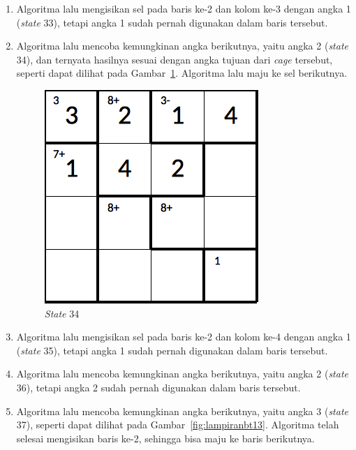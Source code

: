 \begin{enumerate}
\item Algoritma lalu mengisikan sel pada baris ke-2 dan kolom ke-3 dengan angka 1 (\textit{state} 33), tetapi angka 1 sudah pernah digunakan dalam baris tersebut.
\item Algoritma lalu mencoba kemungkinan angka berikutnya, yaitu angka 2 (\textit{state} 34), dan ternyata hasilnya sesuai dengan angka tujuan dari \textit{cage} tersebut, seperti dapat dilihat pada Gambar~\ref{fig:lampiranbt12}. Algoritma lalu maju ke sel berikutnya.

\begin{figure}
\centering
\captionsetup{justification=centering}
\includegraphics[scale=0.333]{Gambar/backtracking/State34}
\caption[\textit{State} 34]{\textit{State} 34}
\label{fig:lampiranbt12}
\end{figure}

\item Algoritma lalu mengisikan sel pada baris ke-2 dan kolom ke-4 dengan angka 1 (\textit{state} 35), tetapi angka 1 sudah pernah digunakan dalam baris tersebut.
\item Algoritma lalu mencoba kemungkinan angka berikutnya, yaitu angka 2 (\textit{state} 36), tetapi angka 2 sudah pernah digunakan dalam baris tersebut.
\item Algoritma lalu mencoba kemungkinan angka berikutnya, yaitu angka 3 (\textit{state} 37), seperti dapat dilihat pada Gambar~\ref{fig:lampiranbt13}. Algoritma telah selesai mengisikan baris ke-2, sehingga bisa maju ke baris berikutnya.


\end{enumerate}
